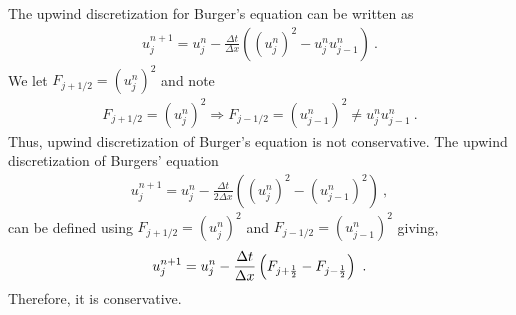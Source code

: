 
\begin{questions}


\begin{solution}

The upwind discretization for Burger's equation can be written as
\begin{align*}
u^{n+1}_j = u^n_j - \frac{\Delta t}{\Delta x}\left(\left(u_j^n\right)^2-u_j^nu_{j-1}^n\right)~.
\end{align*}
We let $F_{j+1/2}=\left(u_j^n\right)^2$ and note
\begin{align*}
F_{j+1/2}=\left(u_j^n\right)^2 \Rightarrow F_{j-1/2} = \left(u_{j-1}^n\right)^2 \neq u_j^nu_{j-1}^n~.
\end{align*}
Thus, upwind discretization of Burger's equation is not conservative. The upwind discretization of Burgers' equation
\begin{align*}
u^{n+1}_j = u^n_j - \frac{\Delta t}{2 \Delta x}
        \left((u^n_j)^2-(u^n_{j-1})^2\right)~,
\end{align*}
can be defined using $F_{j+1/2}=\left(u_j^n\right)^2$ and $F_{j-1/2}=\left(u_{j-1}^n\right)^2$ giving,
\begin{align*}
u^{n+1}_j = u^n_j - \frac{\Delta t}{\Delta x}
	\left(F_{j+\frac{1}{2}} - F_{j-\frac{1}{2}}\right) ~.
\end{align*}
Therefore, it is conservative.

\end{solution}

\end{questions}
